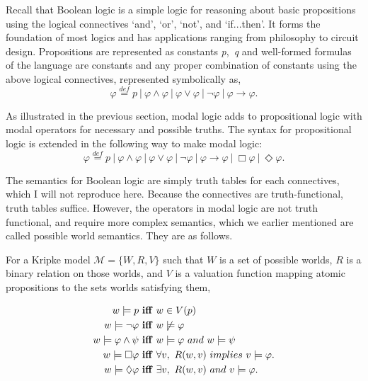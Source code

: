 Recall that Boolean logic is a simple logic for reasoning about basic propositions using the logical connectives `and', `or', `not', and `if...then'. It forms the foundation of most logics and has applications ranging from philosophy to circuit design. Propositions are represented as constants {\emph p,\ \emph q} and well-formed formulas of the language are constants and any proper combination of constants using the above logical connectives, represented symbolically as,
$$\varphi \stackrel{def}{=} p\  |\  \varphi \wedge \varphi\  |\  \varphi \vee \varphi\  |\ \neg \varphi \ |\   \varphi \rightarrow \varphi. 
$$

As illustrated in the previous section, modal logic adds to propositional logic with modal operators for necessary and possible truths. The syntax for propositional logic is extended in the following way to make modal logic:
$$\varphi \stackrel{def}{=} p\  |\  \varphi \wedge \varphi\  |\  \varphi \vee \varphi\  |\ \neg \varphi \ |\   \varphi \rightarrow \varphi\ |\ \Box \varphi \ |\ \Diamond \varphi. 
$$

The semantics for Boolean logic are simply truth tables for each connectives, which I will not reproduce here. Because the connectives are truth-functional, truth tables suffice. However, the operators in modal logic are not truth functional, and require more complex semantics, which we earlier mentioned are called possible world semantics. They are as follows.

For a Kripke model $\mathcal{M} = \{W, R, V\}$ such that $W$ is a set of possible worlds, $R$ is a binary relation on those worlds, and $V$ is a valuation function mapping atomic propositions to the sets worlds satisfying them,  

\begin{align*}
w \models p\  &\mathbf{iff}\ w \in V(p) \\
w \models \neg \varphi\  &\mathbf{iff}\  w\not\models \varphi  \\
w \models \varphi \wedge \psi\ &\mathbf{iff}\ w\models \varphi\ \mathnormal{and}\ w\models \psi \\
w \models \Box \varphi\  &\mathbf{iff}\ \forall v,\ R(w,v)\  \mathnormal{implies}\ v \models \varphi. \\
w \models \Diamond \varphi\ &\mathbf{iff}\ \exists v,\ R(w,v)\ \mathnormal{and}\ v\models \varphi.
\end{align*}

